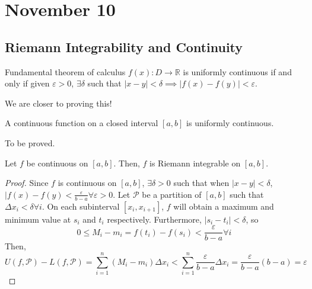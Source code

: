 \chapter{November 10}

\section{Riemann Integrability and Continuity}
\begin{definition}{Fundamental theorem of calculus}{}
    $f(x): D \to \mathbb{R}$ is uniformly continuous if and only if given $\varepsilon > 0$, $\exists \delta$ such that $|x - y| < \delta \implies |f(x) - f(y)| < \varepsilon$.
\end{definition}
\begin{note}{}{}
    We are closer to proving this!
\end{note}

\begin{theorem}{}{}
    A continuous function on a closed interval $[a, b]$ is uniformly continuous.
\end{theorem}
\begin{note}{}{}
    To be proved.
\end{note}

\begin{theorem}{}{}
    Let $f$ be continuous on $[a, b]$. Then, $f$ is Riemann integrable on $[a, b]$.
\end{theorem}
\begin{proof}
    Since $f$ is continuous on $[a, b]$, $\exists \delta > 0$ such that when $|x - y| < \delta$, $|f(x) - f(y) < \frac{\varepsilon}{b - a} \forall \varepsilon > 0$. Let $\mathcal{P}$ be a partition of $[a, b]$ such that $\Delta x_i < \delta \forall i$. On each subinterval $[x_i, x_{i + 1}]$, $f$ will obtain a maximum and minimum value at $s_i$ and $t_i$ respectively. Furthermore, $|s_i - t_i| < \delta$, so $$0 \leq M_i - m_i = f(t_i) - f(s_i) < \frac{\varepsilon}{b - a} \forall i$$ Then, $$U(f, \mathcal{P}) - L(f, \mathcal{P}) = \sum_{i = 1}^n (M_i - m_i) \Delta x_i < \sum_{i = 1}^n \frac{\varepsilon}{b - a} \Delta x_i = \frac{\varepsilon}{b - a} (b - a) = \varepsilon$$
\end{proof}

